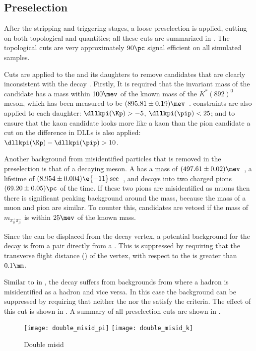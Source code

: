 \subsection{Preselection}
After the stripping and triggering stages, a loose preselection is applied, cutting on both
topological and \pid quantities; all these cuts are summarized in .
The topological cuts are very approximately $90\pc$ signal efficient on all simulated samples.

Cuts are applied to the \Kstar and its daughters to remove candidates that are clearly
inconsistent with the decay  \decay{\Kstarz}{\kpi}.
Firstly, It is required that the invariant mass of the \decay{\Kstarz}{\kpi} candidate has a mass
within $100\mev$ of the known mass of the $K^*(892)^0$ meson, which has been measured to be
$(895.81\pm0.19)\mev$~\cite{PDG2014}.
\pid constraints are also applied to each \Kstar daughter: $\dllkpi(\Kp)>-5$, $\dllkpi(\pip)<25$;
and to ensure that the kaon candidate looks more like a kaon than the pion candidate a cut on the
difference in \glspl{DLL} is also applied: $\dllkpi(\Kp)-\dllkpi(\pip)>10$.

Another background from misidentified particles that is removed in the preselection is that of a
decaying \KS meson.
A \KS has a mass of $(497.61\pm0.02)\mev$~\cite{PDG2012}, a lifetime of
$(8.954\pm0.004)\e{-11}\sec$~\cite{PDG2012}, and decays
into two charged pions $(69.20 \pm0.05)\pc$ of the time.
If these two pions are misidentified as muons then there is significant peaking background around
the \KS mass, because the mass of a muon and pion are similar.
To counter this, candidates are vetoed if the mass of $m_{\pi_\mu^+\pi_\mu^-}$ is within $25\mev$
of the known \KS mass.

Since the \db can be displaced from the \Bd decay vertex, a potential background for the decay
\dbtomumu is from a \mumu pair directly from a \pv.
This is suppressed by requiring that the transverse flight distance (\FDT) of the \db vertex, with
respect to the \pv is greater than $0.1\mm$.

Similar to in , the decay \btokstrdb suffers from backgrounds from
\decay{\Bd}{\jpsi\Kstarz} where a hadron is misidentified as a hadron and vice versa.
In this case the background can be suppressed by requiring that neither the \Kp nor the \pim
satisfy the \ismuon criteria.
The effect of this cut is shown in .
A summary of all preselection cuts are shown in .

\begin{figure}
  \begin{center}
    \texttt{[image: double\_misid\_pi]}
    \texttt{[image: double\_misid\_k]}
    \caption[Effect of the double misidentification veto]
    {
      Double misid
    }
    \label{fig:db:doublemisid}
  \end{center}
\end{figure}

